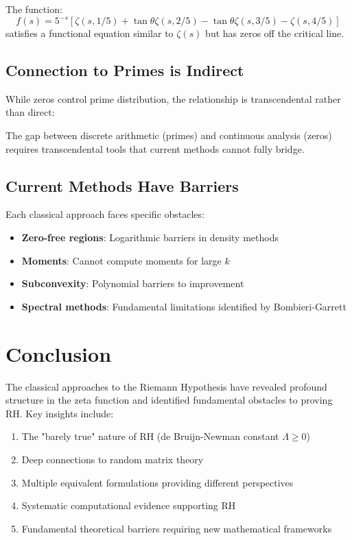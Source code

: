 \begin{example}
The function:
\begin{equation}
f(s) = 5^{-s}[\zeta(s,1/5) + \tan\theta \zeta(s,2/5) - \tan\theta \zeta(s,3/5) - \zeta(s,4/5)]
\end{equation}
satisfies a functional equation similar to $\zeta(s)$ but has zeros off the critical line.
\end{example}

\subsection{Connection to Primes is Indirect}

While zeros control prime distribution, the relationship is transcendental rather than direct:

\begin{remark}
The gap between discrete arithmetic (primes) and continuous analysis (zeros) requires transcendental tools that current methods cannot fully bridge.
\end{remark}

\subsection{Current Methods Have Barriers}

Each classical approach faces specific obstacles:
\begin{itemize}
\item \textbf{Zero-free regions}: Logarithmic barriers in density methods
\item \textbf{Moments}: Cannot compute moments for large $k$
\item \textbf{Subconvexity}: Polynomial barriers to improvement
\item \textbf{Spectral methods}: Fundamental limitations identified by Bombieri-Garrett
\end{itemize}

\section{Conclusion}

The classical approaches to the Riemann Hypothesis have revealed profound structure in the zeta function and identified fundamental obstacles to proving RH. Key insights include:

\begin{enumerate}
\item The "barely true" nature of RH (de Bruijn-Newman constant $\Lambda \geq 0$)
\item Deep connections to random matrix theory
\item Multiple equivalent formulations providing different perspectives
\item Systematic computational evidence supporting RH
\item Fundamental theoretical barriers requiring new mathematical frameworks
\end{enumerate}

